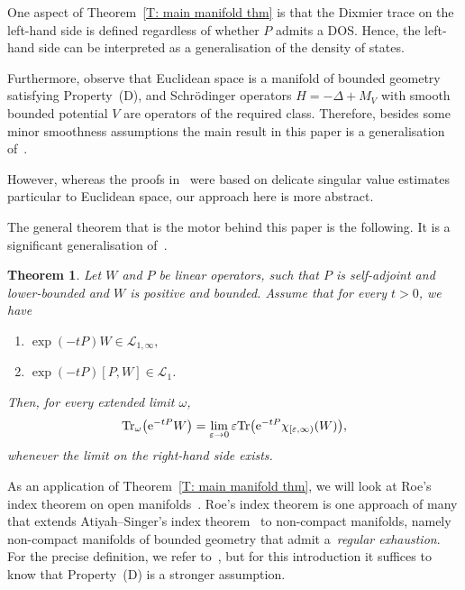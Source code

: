 \documentclass[pdftex]{sigma}
\numberwithin{equation}{section}
\newtheorem{Theorem}{Theorem}[section]
\begin{document}
One aspect of Theorem~\ref{T: main manifold thm} is that the Dixmier trace on the left-hand side is defined regardless of whether $P$ admits a DOS. Hence, the left-hand side can be interpreted as a generalisation of the density of states.

Furthermore, observe that Euclidean space is a manifold of bounded geometry satisfying Property~(D), and Schr\"odinger operators $H=-\Delta + M_V$ with smooth bounded potential $V$ are operators of the required class. Therefore, besides some minor smoothness assumptions the main result in this paper is a generalisation of~\cite{AMSZ}.

However, whereas the proofs in~\cite{AMSZ} were based on delicate singular value estimates particular to Euclidean space, our approach here is more abstract.

The general theorem that is the motor behind this paper is the following. It is a significant generalisation of~\cite[Theorem~5.7]{AMSZ}.

\begin{Theorem}\label{main_theorem}
 Let $W$ and $P$ be linear operators, such that $P$ is self-adjoint and lower-bounded and $W$ is positive and bounded. Assume that for every $t>0$, we have
 \begin{enumerate}\itemsep=0pt
 \item[$(i)$] $\exp(-tP)W \in \mathcal{L}_{1,\infty},$ %
 \item[$(ii)$] $\exp(-tP)[P,W] \in \mathcal{L}_1$. %
 \end{enumerate}
 Then, for every extended limit $\omega$,
 \[
 \mathrm{Tr}_{\omega}\big({\rm e}^{-tP}W\big) = \lim_{\varepsilon\to 0} \varepsilon \mathrm{Tr}\big({\rm e}^{-tP}\chi_{[\varepsilon,\infty)}(W)\big),
 \]
 whenever the limit on the right-hand side exists.
\end{Theorem}

As an application of Theorem~\ref{T: main manifold thm}, we will look at Roe's index theorem on open manifolds~\cite{Roe1988a}. Roe's index theorem is one approach of many that extends Atiyah--Singer's index theorem~\cite{AtiyahSinger1963} to non-compact manifolds, namely non-compact manifolds of bounded geometry that admit a~\textit{regular exhaustion}. For the precise definition, we refer to~\cite[Section~6]{Roe1988a}, but for this introduction it suffices to know that Property~(D) is a stronger assumption.
\end{document}
